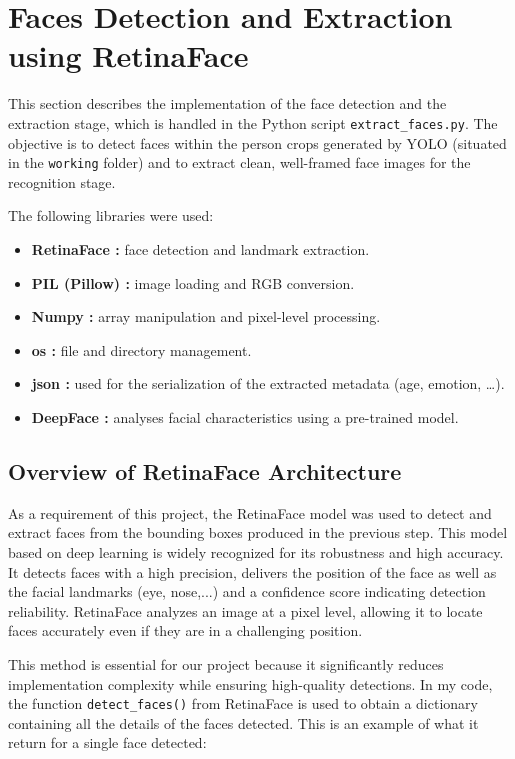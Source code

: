 \documentclass[a4paper,12pt]{article}
\begin{document}
\newpage

\section{Faces Detection and Extraction using RetinaFace}

This section describes the implementation of the face detection and the extraction stage, which is handled in the Python script \texttt{extract\_faces.py}. The objective is to detect faces within the person crops generated by YOLO (situated in the \texttt{working} folder) and to extract clean, well-framed face images for the recognition stage.

The following libraries were used:
\begin{itemize}
    \item \textbf{RetinaFace :} face detection and landmark extraction.
    \item \textbf{PIL (Pillow) :} image loading and RGB conversion.
    \item \textbf{Numpy :} array manipulation and pixel-level processing.
    \item \textbf{os :} file and directory management.
    \item \textbf{json :} used for the serialization of the extracted metadata (age, emotion, …).
    \item \textbf{DeepFace :} analyses facial characteristics using a pre-trained model.
\end{itemize}



\subsection{Overview of RetinaFace Architecture}

As a requirement of this project, the RetinaFace model was used to detect and extract faces from the bounding boxes produced in the previous step. This  model based on deep learning  is widely recognized for its robustness and high accuracy. It detects faces with a high precision, delivers the position of the face as well as the facial landmarks (eye, nose,...) and a confidence score indicating detection reliability. RetinaFace analyzes an image at a pixel level, allowing it to locate faces accurately even if they are in a challenging position.

This method is essential for our project because it significantly reduces implementation complexity while ensuring high-quality detections. In my code, the function \texttt{detect\_faces()} from RetinaFace is used to obtain a dictionary containing all the details of the faces detected. 
This is an example of what it return for a single face detected:
\end{document}
